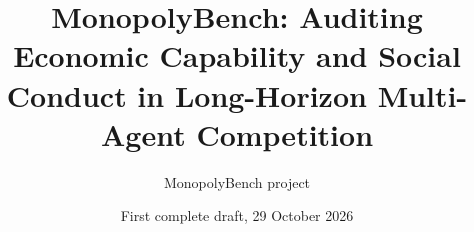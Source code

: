 \documentclass[11pt,letterpaper]{article}
\title{MonopolyBench: Auditing Economic Capability and Social Conduct in Long-Horizon Multi-Agent Competition}
\author{MonopolyBench project}
\date{First complete draft, 29 October 2026}
\begin{document}
\maketitle
\begin{abstract}

\end{abstract}












\clearpage
\appendix

\end{document}
